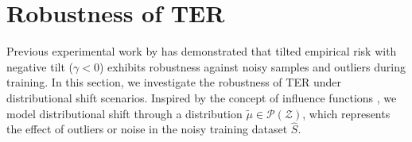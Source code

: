 \documentclass{article}
\theoremstyle{plain}
\theoremstyle{plain}
\theoremstyle{definition}
\theoremstyle{remark}
\begin{document}
\section{Robustness of TER}\label{sec: robust}
Previous experimental work by \citet{li2020tilted, li2023tilted} has demonstrated that tilted empirical risk with negative tilt ($\gamma<0$) exhibits robustness against noisy samples and outliers during training. In this section, we investigate the robustness of TER under distributional shift scenarios. Inspired by the concept of influence functions \citep{marceau2001robustness,christmann2004robustness,ronchetti2009robust}, we model distributional shift through a distribution $\tilde{\mu}\in\mathcal{P}(\mathcal{Z})$, which represents the effect of outliers or noise in the noisy training dataset $\hat{S}$. 
\end{document}
